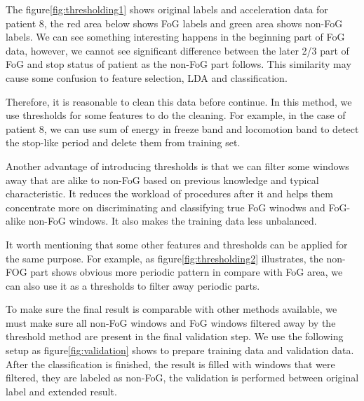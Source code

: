 \documentclass[article]{article}
\begin{document}
The figure\ref{fig:thresholding1} shows original labels and acceleration data for patient 8, the red area below shows FoG labels and green area shows non-FoG labels. We can see something interesting happens in the beginning part of FoG data, however, we cannot see significant difference between the later 2/3 part of FoG and stop status of patient as the non-FoG part follows. This similarity may cause some confusion to feature selection, LDA and classification. 

Therefore, it is reasonable to clean this data before continue. In this method, we use thresholds for some features to do the cleaning. For example, in the case of patient 8, we can use sum of energy in freeze band and locomotion band to detect the stop-like period and delete them from training set. 

Another advantage of introducing thresholds is that we can filter some windows away that are alike to non-FoG based on previous knowledge and typical characteristic. It reduces the workload of procedures after it and helps them concentrate more on discriminating and classifying true FoG winodws and FoG-alike non-FoG windows. It also makes the training data less unbalanced.

It worth mentioning that some other features and thresholds can be applied for the same purpose. For example, as figure\ref{fig:thresholding2} illustrates, the non-FOG part shows obvious more periodic pattern in compare with FoG area, we can also use it as a thresholds to filter away periodic parts. 

To make sure the final result is comparable with other methods available, we must make sure all non-FoG windows and FoG windows filtered away by the threshold method are present in the final validation step. We use the following setup as figure\ref{fig:validation} shows to prepare training data and validation data. After the classification is finished, the result is filled with windows that were filtered, they are labeled as non-FoG, the validation is performed between original label and extended result.
\end{document}
